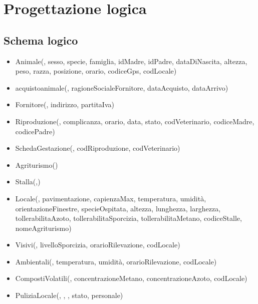\documentclass[12pt,a4paper]{article}
\begin{document}
\section{Progettazione logica}

\subsection{Schema logico}

\begin{itemize}

\item Animale(\underline{}, sesso, specie, famiglia, idMadre, idPadre, dataDiNascita, altezza, peso, razza, posizione, orario,  codiceGps,  codLocale)
\item acquistoanimale(\underline{}, ragioneSocialeFornitore,  dataAcquisto,  dataArrivo)
\item Fornitore(\underline{}, indirizzo, partitaIva)
\item Riproduzione(\underline{}, complicanza, orario, data, stato,  codVeterinario, codiceMadre, codicePadre)
\item SchedaGestazione(\underline{},  codRiproduzione,  codVeterinario)
\item Agriturismo(\underline{})
\item Stalla(\underline{},\underline{})
\item Locale(\underline{}, pavimentazione, capienzaMax, temperatura, umidità, orientazioneFinestre, specieOspitata, altezza, lunghezza, larghezza, tollerabilitaAzoto, tollerabilitaSporcizia, tollerabilitaMetano, codiceStalle, nomeAgriturismo)
\item Visivi(\underline{}, livelloSporcizia,  orarioRilevazione,  codLocale)
\item Ambientali(\underline{}, temperatura, umidità,  orarioRilevazione,  codLocale)
\item CompostiVolatili(\underline{}, concentrazioneMetano, concentrazioneAzoto,  codLocale)
\item PuliziaLocale(\underline{}, \underline{}, \underline{}, stato, personale)

\end{itemize}
\end{document}
